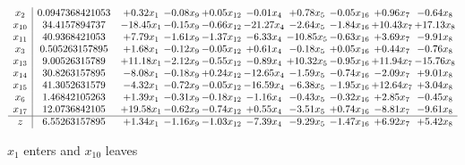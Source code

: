 \documentclass[9pt]{article}
\begin{document}
 \[\begin{array}{c| c c@{\hskip 2pt} c@{\hskip 2pt} c@{\hskip 2pt} c@{\hskip 2pt} c@{\hskip 2pt} c@{\hskip 2pt} c@{\hskip 2pt} c@{\hskip 2pt} }
 x_{2}   &  0.0947368421053 & +  0.32 x_{1} & -0.08 x_{9} & +  0.05 x_{12} & -0.01 x_{4} & +  0.78 x_{5} & -0.05 x_{16} & +  0.96 x_{7} & -0.64 x_{8}\\
 x_{10}   &  34.4157894737 & -18.45 x_{1} & -0.15 x_{9} & -0.66 x_{12} & -21.27 x_{4} & -2.64 x_{5} & -1.84 x_{16} & + 10.43 x_{7} & + 17.13 x_{8}\\
 x_{11}   &  40.9368421053 & +  7.79 x_{1} & -1.61 x_{9} & -1.37 x_{12} & -6.33 x_{4} & -10.85 x_{5} & -0.63 x_{16} & +  3.69 x_{7} & -9.91 x_{8}\\
 x_{3}   &  0.505263157895 & +  1.68 x_{1} & -0.12 x_{9} & -0.05 x_{12} & +  0.61 x_{4} & -0.18 x_{5} & +  0.05 x_{16} & +  0.44 x_{7} & -0.76 x_{8}\\
 x_{13}   &  9.00526315789 & + 11.18 x_{1} & -2.12 x_{9} & -0.55 x_{12} & -0.89 x_{4} & + 10.32 x_{5} & -0.95 x_{16} & + 11.94 x_{7} & -15.76 x_{8}\\
 x_{14}   &  30.8263157895 & -8.08 x_{1} & -0.18 x_{9} & +  0.24 x_{12} & -12.65 x_{4} & -1.59 x_{5} & -0.74 x_{16} & -2.09 x_{7} & +  9.01 x_{8}\\
 x_{15}   &  41.3052631579 & -4.32 x_{1} & -0.72 x_{9} & -0.05 x_{12} & -16.59 x_{4} & -6.38 x_{5} & -1.95 x_{16} & + 12.64 x_{7} & +  3.04 x_{8}\\
 x_{6}   &  1.46842105263 & +  1.39 x_{1} & -0.31 x_{9} & -0.18 x_{12} & -1.16 x_{4} & -0.43 x_{5} & -0.32 x_{16} & +  2.85 x_{7} & -0.45 x_{8}\\
 x_{17}   &  12.0736842105 & + 19.58 x_{1} & -0.62 x_{9} & -0.74 x_{12} & +  0.55 x_{4} & -3.51 x_{5} & +  0.74 x_{16} & -8.81 x_{7} & -9.61 x_{8}\\
\hline
z    &  6.55263157895 & +  1.34 x_{1} & -1.16 x_{9} & -1.03 x_{12} & -7.39 x_{4} & -9.29 x_{5} & -1.47 x_{16} & +  6.92 x_{7} & +  5.42 x_{8}\\
\end{array}\]


 $ x_{1} $ enters and $ x_{10} $ leaves 
\end{document}
